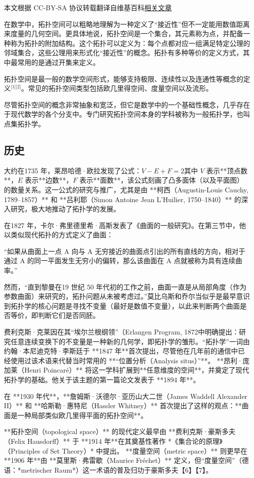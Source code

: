 
本文根据 CC-BY-SA 协议转载翻译自维基百科\href{https://en.wikipedia.org/wiki/Topological_space}{相关文章}

在数学中，拓扑空间可以粗略地理解为一种定义了“接近性”但不一定能用数值距离来度量的几何空间。更具体地说，拓扑空间是一个集合，其元素称为点，并配备一种称为拓扑的附加结构。这个拓扑可以定义为：每个点都对应一组满足特定公理的邻域集合，这些公理用来形式化“接近性”的概念。拓扑有多种等价的定义方式，其中最常用的是通过开集来定义。

拓扑空间是最一般的数学空间形式，能够支持极限、连续性以及连通性等概念的定义\(^\text{[1][2]}\)。常见的拓扑空间类型包括欧几里得空间、度量空间以及流形。

尽管拓扑空间的概念非常抽象和宽泛，但它是数学中的一个基础性概念，几乎存在于现代数学的各个分支中。专门研究拓扑空间本身的学科被称为一般拓扑学，也叫点集拓扑学。
\subsection{历史}
大约在1735 年，莱昂哈德·欧拉发现了公式：$V - E + F = 2$其中 $V$ 表示**顶点数**，$E$ 表示**边数**，$F$ 表示**面数**，该公式刻画了凸多面体（以及平面图）的数量关系。这一公式的研究与推广，尤其是由 **柯西（Augustin-Louis Cauchy, 1789–1857）** 和 **吕利耶（Simon Antoine Jean L'Huilier, 1750–1840）** 的深入研究，极大地推动了拓扑学的发展。

在1827 年，卡尔·弗里德里希·高斯发表了《曲面的一般研究》。在第三节中，他以类似现代拓扑的方式定义了曲面：

“如果从曲面上一点 A 向与 A 无穷接近的曲面点引出的所有直线的方向，相对于通过 A 的同一平面发生无穷小的偏转，那么该曲面在 A 点就被称为具有连续曲率。”

然而，“直到黎曼在19 世纪 50 年代初的工作之前，曲面一直是从局部角度（作为参数曲面）来研究的，拓扑问题从未被考虑过。”莫比乌斯和乔尔当似乎是最早意识到拓扑学的核心问题是寻找不变量（最好是数值不变量），以此来判断两个曲面是否等价，即判断它们是否同胚。

费利克斯·克莱因在其“埃尔兰根纲领”（Erlangen Program, 1872中明确提出：研究任意连续变换下的不变量是一种新的几何学，即拓扑学的雏形。“拓扑学”一词由约翰·本尼迪克特·李斯廷于 **1847 年**首次提出，尽管他在几年前的通信中已经使用过该术语来代替当时常用的 **“位置分析（Analysis situs）”**。
**昂利·庞加莱（Henri Poincaré）** 将这一学科扩展到**任意维度的空间**，并奠定了现代拓扑学的基础。他关于该主题的第一篇论文发表于 **1894 年**。

在 **1930 年代**，**詹姆斯·沃德尔·亚历山大二世（James Waddell Alexander II）** 和 **哈斯勒·惠特尼（Hassler Whitney）** 首次提出了这样的观点：**曲面是一种局部类似欧几里得平面的拓扑空间**。

**拓扑空间（topological space）** 的现代定义最早由 **费利克斯·豪斯多夫（Felix Hausdorff）** 于 **1914 年**在其奠基性著作 *《集合论的原理》（Principles of Set Theory）* 中提出。
**度量空间（metric space）** 则更早在 **1906 年**由 **莫里斯·弗雷歇（Maurice Fréchet）** 定义，但“度量空间”（德语：*metrischer Raum*）这一术语的普及归功于豪斯多夫【6】【7】。

